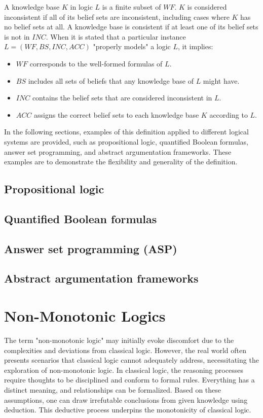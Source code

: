 A knowledge base \(K\) in logic \(L\) is a finite subset of \(WF\).
\(K\) is considered inconsistent if all of its belief sets are inconsistent, including cases where \(K\) has no belief sets at all.
A knowledge base is consistent if at least one of its belief sets is not in \(INC\).
When it is stated that a particular instance \(L = (WF, BS, INC, ACC)\) "properly models" a logic \(L\), it implies:
\begin{itemize}
      \item \(WF\) corresponds to the well-formed formulas of \(L\).
      \item \(BS\) includes all sets of beliefs that any knowledge base of \(L\) might have.
      \item \(INC\) contains the belief sets that are considered inconsistent in \(L\).
      \item \(ACC\) assigns the correct belief sets to each knowledge base \(K\) according to \(L\).
\end{itemize}

In the following sections, examples of this definition applied to different logical systems are provided, such as propositional logic, quantified Boolean formulas, answer set programming, and abstract argumentation frameworks. These examples are to demonstrate the flexibility and generality of the definition.

\subsection{Propositional logic}
\cite{gelfond_classical_1991}

\subsection{Quantified Boolean formulas}
\cite{gelfond_logic_2002}

\subsection{Answer set programming (ASP)}
\cite{brewka_answer_2011}

\subsection{Abstract argumentation frameworks}
\cite{dung_acceptability_1995}

\section{Non-Monotonic Logics}
The term "non-monotonic logic" may initially evoke discomfort due to the complexities and deviations from classical logic.
However, the real world often presents scenarios that classical logic cannot adequately address, necessitating the exploration of non-monotonic logic.
In classical logic, the reasoning processes require thoughts to be disciplined and conform to formal rules.
Everything has a distinct meaning, and relationships can be formalized. Based on these assumptions, one can draw irrefutable conclusions from given knowledge using deduction.
This deductive process underpins the monotonicity of classical logic.

